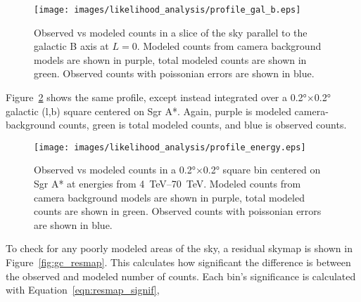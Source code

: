  \begin{figure}[h]
    \centering
    \texttt{[image: images/likelihood\_analysis/profile\_gal\_b.eps]}
    \caption[Galactic Center Profile vs Galactic B]{
      Observed vs modeled counts in a slice of the sky parallel to the galactic B axis at $L=0$.
      Modeled counts from camera background models are shown in purple, total modeled counts are shown in green.
      Observed counts with poissonian errors are shown in blue.
    }
    \label{fig:gc_profile_gal_b}
  \end{figure}

  Figure~\ref{fig:gc_profile_energy} shows the same profile, except instead integrated over a \ang{0.2}$\times$\ang{0.2} galactic (l,b) square centered on Sgr A*.
  Again, purple is modeled camera-background counts, green is total modeled counts, and blue is observed counts.
  
  \begin{figure}[h]
    \centering
    \texttt{[image: images/likelihood\_analysis/profile\_energy.eps]}
    \caption[Galactic Center Profile vs Energy]{
      Observed vs modeled counts in a \ang{0.2}$\times$\ang{0.2} square bin centered on Sgr A* at energies from \SIrange{4}{70}{TeV}.
      Modeled counts from camera background models are shown in purple, total modeled counts are shown in green.
      Observed counts with poissonian errors are shown in blue.
    }
    \label{fig:gc_profile_energy}
  \end{figure}
  
  To check for any poorly modeled areas of the sky, a residual skymap is shown in Figure~\ref{fig:gc_resmap}.
  This calculates how significant the difference is between the observed and modeled number of counts.
  Each bin's significance is calculated with Equation~\ref{eqn:resmap_signif},
  
